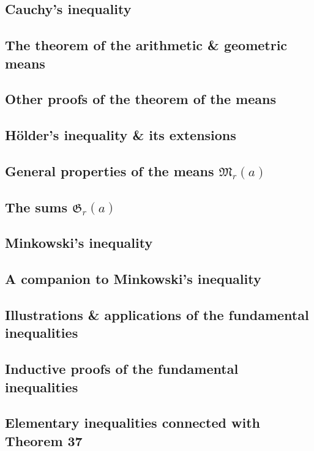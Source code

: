 \documentclass[oneside]{book}
\numberwithin{equation}{section}
\begin{document}
\subsection{Cauchy's inequality}

\subsection{The theorem of the arithmetic \& geometric means}

\subsection{Other proofs of the theorem of the means}

\subsection{H\"older's inequality \& its extensions}

\subsection{General properties of the means $\mathfrak{M}_r(a)$}

\subsection{The sums $\mathfrak{G}_r(a)$}

\subsection{Minkowski's inequality}

\subsection{A companion to Minkowski's inequality}

\subsection{Illustrations \& applications of the fundamental inequalities}

\subsection{Inductive proofs of the fundamental inequalities}

\subsection{Elementary inequalities connected with Theorem 37}
\end{document}
